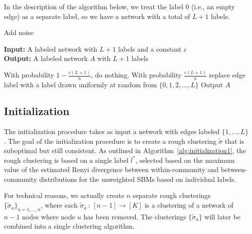 \documentclass{article}
\begin{document}
In the description of the algorithm below, we treat the label 0 (i.e., an empty edge) as a separate label, so we have a network with a total of $L+1$ labels.

\begin{algorithm}
\caption{Add noise}
\label{alg:noisify}
\textbf{Input:} A labeled network with $L+1$ labels and a constant $c$\\
\textbf{Output:} A labeled network $A$ with $L+1$ labels\\

\begin{algorithmic}
   \State With probability $1-\frac{c(L+1)}{n}$, do nothing. With probability $\frac{c(L+1)}{n}$ replace edge label with a label drawn uniformly at random from $\{0, 1, 2, \dots, L\}$
\EndFor
\State Output $A$
\end{algorithmic}
\end{algorithm}

\subsection{Initialization}

The initialization procedure takes as input a network with edges labeled $\{1, \dots, L\}$. The goal of the initialization procedure is to create a rough clustering $\tilde{\sigma}$ that is suboptimal but still consistent. As outlined in Algorithm~\ref{alg:initialization1}, the rough clustering is based on a single label $l^*$, selected based on the maximum value of the estimated Renyi divergence between within-community and between-community distributions for the unweighted SBMs based on individual labels.

For technical reasons, we actually create $n$ separate rough clusterings $\{\tilde{\sigma}_u \}_{u = 1, \dots, n}$, where each $\tilde{\sigma}_u \,:\, [n-1] \rightarrow [K]$ is a clustering of a network of $n-1$ nodes where node $u$ has been removed. The clusterings $\{\tilde{\sigma}_u\}$ will later be combined into a single clustering algorithm.
\end{document}
